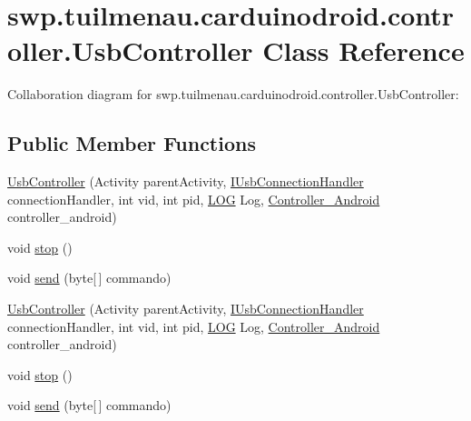 \hypertarget{classswp_1_1tuilmenau_1_1carduinodroid_1_1controller_1_1_usb_controller}{}\section{swp.\+tuilmenau.\+carduinodroid.\+controller.\+Usb\+Controller Class Reference}
\label{classswp_1_1tuilmenau_1_1carduinodroid_1_1controller_1_1_usb_controller}


Collaboration diagram for swp.\+tuilmenau.\+carduinodroid.\+controller.\+Usb\+Controller\+:
\subsection*{Public Member Functions}
\begin{DoxyCompactItemize}
\item 
\hyperlink{classswp_1_1tuilmenau_1_1carduinodroid_1_1controller_1_1_usb_controller_a49aa06782978ab1150cd4b12598723a4}{Usb\+Controller} (Activity parent\+Activity, \hyperlink{interfaceswp_1_1tuilmenau_1_1carduinodroid_1_1controller_1_1_i_usb_connection_handler}{I\+Usb\+Connection\+Handler} connection\+Handler, int vid, int pid, \hyperlink{classswp_1_1tuilmenau_1_1carduinodroid_1_1model_1_1_l_o_g}{L\+O\+G} Log, \hyperlink{classswp_1_1tuilmenau_1_1carduinodroid_1_1controller_1_1_controller___android}{Controller\+\_\+\+Android} controller\+\_\+android)
\item 
void \hyperlink{classswp_1_1tuilmenau_1_1carduinodroid_1_1controller_1_1_usb_controller_aad2ce37fa78ebb224974eee0b71aac44}{stop} ()
\item 
void \hyperlink{classswp_1_1tuilmenau_1_1carduinodroid_1_1controller_1_1_usb_controller_a7b1a2e2fe0ba3f44d78634e388e2092e}{send} (byte\mbox{[}$\,$\mbox{]} commando)
\item 
\hyperlink{classswp_1_1tuilmenau_1_1carduinodroid_1_1controller_1_1_usb_controller_a49aa06782978ab1150cd4b12598723a4}{Usb\+Controller} (Activity parent\+Activity, \hyperlink{interfaceswp_1_1tuilmenau_1_1carduinodroid_1_1controller_1_1_i_usb_connection_handler}{I\+Usb\+Connection\+Handler} connection\+Handler, int vid, int pid, \hyperlink{classswp_1_1tuilmenau_1_1carduinodroid_1_1model_1_1_l_o_g}{L\+O\+G} Log, \hyperlink{classswp_1_1tuilmenau_1_1carduinodroid_1_1controller_1_1_controller___android}{Controller\+\_\+\+Android} controller\+\_\+android)
\item 
void \hyperlink{classswp_1_1tuilmenau_1_1carduinodroid_1_1controller_1_1_usb_controller_aad2ce37fa78ebb224974eee0b71aac44}{stop} ()
\item 
void \hyperlink{classswp_1_1tuilmenau_1_1carduinodroid_1_1controller_1_1_usb_controller_a7b1a2e2fe0ba3f44d78634e388e2092e}{send} (byte\mbox{[}$\,$\mbox{]} commando)
\end{DoxyCompactItemize}
